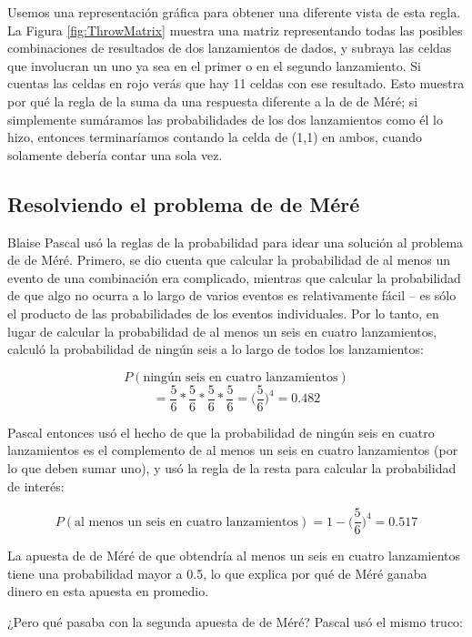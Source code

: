 \documentclass[
  12pt,
]{book}
\theoremstyle{definition}
\theoremstyle{definition}
\theoremstyle{definition}
\theoremstyle{remark}
\begin{document}
Usemos una representación gráfica para obtener una diferente vista de esta regla. La Figura \ref{fig:ThrowMatrix} muestra una matriz representando todas las posibles combinaciones de resultados de dos lanzamientos de dados, y subraya las celdas que involucran un uno ya sea en el primer o en el segundo lanzamiento. Si cuentas las celdas en rojo verás que hay 11 celdas con ese resultado. Esto muestra por qué la regla de la suma da una respuesta diferente a la de de Méré; si simplemente sumáramos las probabilidades de los dos lanzamientos como él lo hizo, entonces terminaríamos contando la celda de (1,1) en ambos, cuando solamente debería contar una sola vez.

\hypertarget{resolviendo-el-problema-de-de-muxe9ruxe9}{%
\subsection{Resolviendo el problema de de Méré}\label{resolviendo-el-problema-de-de-muxe9ruxe9}}

Blaise Pascal usó la reglas de la probabilidad para idear una solución al problema de de Méré. Primero, se dio cuenta que calcular la probabilidad de al menos un evento de una combinación era complicado, mientras que calcular la probabilidad de que algo no ocurra a lo largo de varios eventos es relativamente fácil -- es sólo el producto de las probabilidades de los eventos individuales. Por lo tanto, en lugar de calcular la probabilidad de al menos un seis en cuatro lanzamientos, calculó la probabilidad de ningún seis a lo largo de todos los lanzamientos:

\[
P(\text{ningún seis en cuatro lanzamientos})
\]
\[
= \frac{5}{6}*\frac{5}{6}*\frac{5}{6}*\frac{5}{6}=\bigg(\frac{5}{6}\bigg)^4=0.482
\]

Pascal entonces usó el hecho de que la probabilidad de ningún seis en cuatro lanzamientos es el complemento de al menos un seis en cuatro lanzamientos (por lo que deben sumar uno), y usó la regla de la resta para calcular la probabilidad de interés:

\[
P(\text{al menos un seis en cuatro lanzamientos}) = 1 - \bigg(\frac{5}{6}\bigg)^4=0.517
\]

La apuesta de de Méré de que obtendría al menos un seis en cuatro lanzamientos tiene una probabilidad mayor a 0.5, lo que explica por qué de Méré ganaba dinero en esta apuesta en promedio.

¿Pero qué pasaba con la segunda apuesta de de Méré? Pascal usó el mismo truco:
\end{document}

